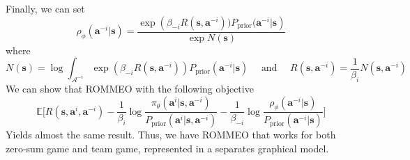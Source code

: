 Finally, we can set 
\begin{equation}
    \rho_{\phi}(\boldsymbol{a}^{-i} | \boldsymbol{s}) = \frac{\exp\left(\beta_{-i} R(\boldsymbol{s}, \boldsymbol{a}^{-i})) P_{\text{prior}}(\boldsymbol{a}^{-i} | \boldsymbol{s}\right)}{\exp N(\boldsymbol{s})}
\end{equation}
where 
\begin{equation}
    N(\boldsymbol{s}) = \log \int_{\mathcal{A}^{-i}} \exp(\beta_{-i} R(\boldsymbol{s}, \boldsymbol{a}^{-i})) P_{\text{prior}}(\boldsymbol{a}^{-i} | \boldsymbol{s}) \quad \text{ and } \quad  R(\boldsymbol{s}, \boldsymbol{a}^{-i}) = \frac{1}{\beta_{i}}N(\boldsymbol{s}, \boldsymbol{a}^{-i})
\end{equation}
We can show that ROMMEO with the following objective 
\begin{equation}
    \mathbb{E}\Bigg[ R(\boldsymbol{s}, \boldsymbol{a}^i, \boldsymbol{a}^{-i}) - \frac{1}{\beta_i} \log \frac{\pi_{\theta}(\boldsymbol{a}^i | \boldsymbol{s}, \boldsymbol{a}^{-i})}{P_{\text{prior}}(\boldsymbol{a}^i | \boldsymbol{s}, \boldsymbol{a}^{-i})} - \frac{1}{\beta_{-i}} \log \frac{\rho_{\phi}(\boldsymbol{a}^{-i} | \boldsymbol{s})}{P_{\text{prior}}(\boldsymbol{a}^{-i} | \boldsymbol{s})}  \Bigg]
\end{equation}
Yields almost the same result. Thus, we have ROMMEO that works for both zero-sum game and team game, represented in a separates graphical model. 




















